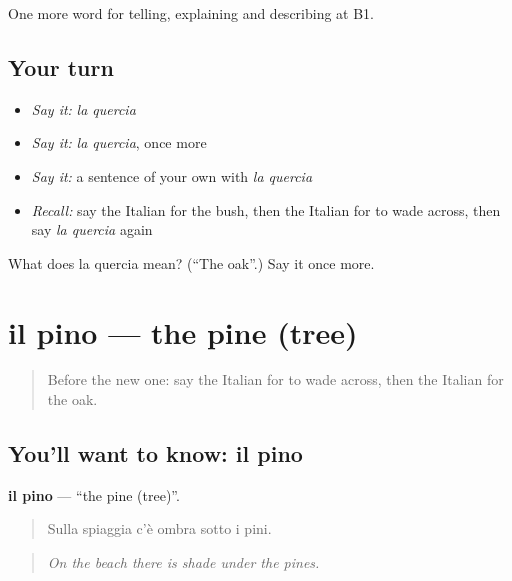\begin{grammarlens}[title={What you've built}]
One more word for telling, explaining and describing at B1.
\end{grammarlens}

\subsection*{Your turn}
\begin{itemize}
\raggedright
  \item \emph{Say it:} \emph{la quercia}
  \item \emph{Say it:} \emph{la quercia}, once more
  \item \emph{Say it:} a sentence of your own with \emph{la quercia}
  \item \emph{Recall:} say the Italian for the bush, then the Italian for to wade across, then say \emph{la quercia} again
\end{itemize}

\begin{tcolorbox}[breakable,colback=teal!4,colframe=teal!35!black,title={Before you move on}]
What does la quercia mean? (\textquotedblleft{}The oak\textquotedblright{}.) Say it once more.
\end{tcolorbox}
\section[il pino]{il pino — the pine (tree)}

\label{lesson:IT-C461-pino}



\begin{quote}
Before the new one: say the Italian for to wade across, then the Italian for the oak.
\end{quote}

\subsection*{You'll want to know: il pino}
\textbf{il pino} — \textquotedblleft{}the pine (tree)\textquotedblright{}.

\begin{quote}
Sulla spiaggia c'è ombra sotto i pini.
\end{quote}

\begin{quote}
\emph{On the beach there is shade under the pines.}
\end{quote}

